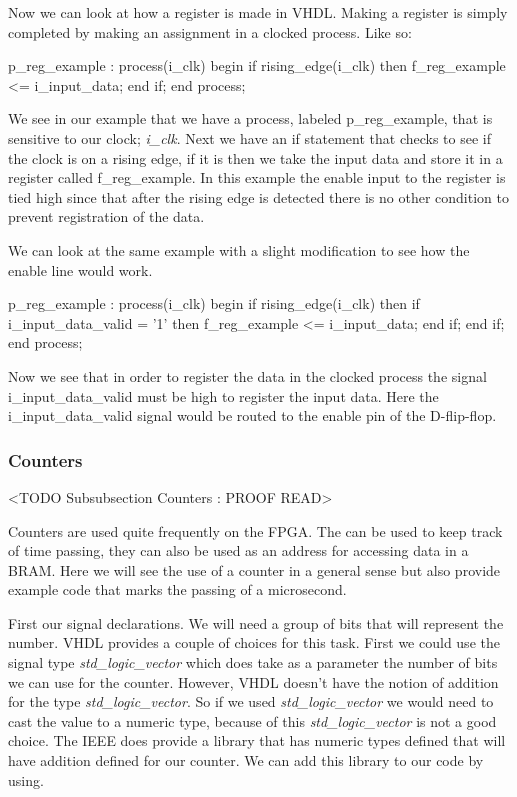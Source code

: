 Now we can look at how a register is made in \ac{VHDL}. Making a register is simply completed by making an assignment in a clocked process. Like so:

\begin{VHDLlisting}[tabsize=8]
p_reg_example : process(i_clk)
begin
	if rising_edge(i_clk) then
		f_reg_example <= i_input_data;
	end if;
end process;
\end{VHDLlisting}
	
We see in our example that we have a process, labeled p\_reg\_example, that is sensitive to our clock; \emph{i\_clk}. Next we have an if statement that checks to see if the clock is on a rising edge, if it is then we take the input data and store it in a register called f\_reg\_example. In this example the enable input to the register is tied high since that after the rising edge is detected there is no other condition to prevent registration of the data.  	
	
We can look at the same example with a slight modification to see how the enable line would work.
	

\begin{VHDLlisting}[tabsize=8]
p_reg_example : process(i_clk)
begin
	if rising_edge(i_clk) then
		if i_input_data_valid = '1' then
			f_reg_example <= i_input_data;
		end if;
	end if;
end process;
\end{VHDLlisting}
	
Now we see that in order to register the data in the clocked process the signal i\_input\_data\_valid must be high to register the input data. Here the i\_input\_data\_valid signal would be routed to the enable pin of the D-flip-flop.
	
	
\subsubsection{Counters}
	<TODO Subsubsection  Counters : PROOF READ>
	
Counters are used quite frequently on the \ac{FPGA}. The can be used to keep track of time passing, they can also be used as an address for accessing data in a \ac{BRAM}. Here we will see the use of a counter in a general sense but also provide example code that marks the passing of a microsecond. 

First our signal declarations. We will need a group of bits that will represent the number. \ac{VHDL} provides a couple of choices for this task. First we could use the signal type \emph{std\_logic\_vector} which does take as a parameter the number of bits we can use for the counter. However, \ac{VHDL} doesn't have the notion of addition for the type \emph{std\_logic\_vector}. So if we used \emph{std\_logic\_vector} we would need to cast the value to a numeric type, because of this \emph{std\_logic\_vector} is not a good choice. The \ac{IEEE} does provide a library that has numeric types defined that will have addition defined for our counter. We can add this library to our code by using. 

